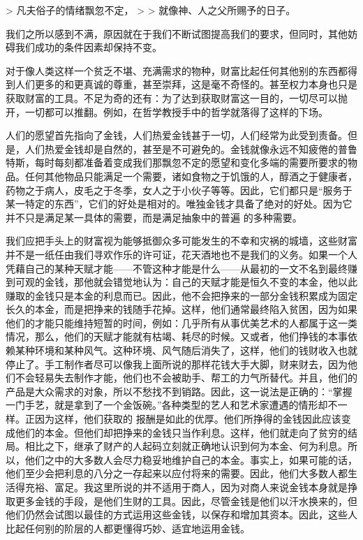 \documentclass[12pt,oneside]{book}
\begin{document}


> 凡夫俗子的情绪飘忽不定，
>
> 就像神、人之父所赐予的日子。 

 

我们之所以感到不满，原因就在于我们不断试图提高我们的要求，但同时，其他妨碍我们成功的条件因素却保持不变。 

对于像人类这样一个贫乏不堪、充满需求的物种，财富比起任何其他别的东西都得到人们更多的和更真诚的尊重，甚至崇拜，这是毫不奇怪的。甚至权力本身也只是获取财富的工具。不足为奇的还有：为了达到获取财富这一目的，一切尽可以抛开，一切都可以推翻。例如，在哲学教授手中的哲学就落得了这样的下场。 

人们的愿望首先指向了金钱，人们热爱金钱甚于一切，人们经常为此受到责备。但是，人们热爱金钱却是自然的，甚至是不可避免的。金钱就像永远不知疲倦的普鲁特斯，每时每刻都准备着变成我们那飘忽不定的愿望和变化多端的需要所要求的物品。任何其他物品只能满足一个需要，诸如食物之于饥饿的人，醇酒之于健康者，药物之于病人，皮毛之于冬季，女人之于小伙子等等。因此，它们都只是“服务于某一特定的东西”，它们的好处是相对的。唯独金钱才具备了绝对的好处。因为它并不只是满足某一具体的需要，而是满足抽象中的普遍
的多种需要。 

我们应把手头上的财富视为能够抵御众多可能发生的不幸和灾祸的城墙，这些财富并不是一纸任由我们寻欢作乐的许可证，花天酒地也不是我们的义务。如果一个人凭藉自己的某种天赋才能——不管这种才能是什么——从最初的一文不名到最终赚到可观的金钱，那他就会错觉地认为：自己的天赋才能是恒久不变的本金，他以此赚取的金钱只是本金的利息而已。因此，他不会把挣来的一部分金钱积累成为固定长久的本金，而是把挣来的钱随手花掉。这样，他们通常最终陷入贫困，因为如果他们的才能只能维持短暂的时间，例如：几乎所有从事优美艺术的人都属于这一类情况，那么，他们的天赋才能就有枯竭、耗尽的时候。又或者，他们挣钱的本事依赖某种环境和某种风气。这种环境、风气随后消失了，这样，他们的钱财收入也就停止了。手工制作者尽可以像我上面所说的那样花钱大手大脚，财来财去，因为他们不会轻易失去制作才能，他们也不会被助手、帮工的力气所替代。并且，他们的产品是大众需求的对象，所以不愁找不到销路。因此，这一说法是正确的：“掌握一门手艺，就是拿到了一个金饭碗。”各种类型的艺人和艺术家遭遇的情形却不一样。正因为这样，他们获取的
报酬是如此的优厚。他们所挣得的金钱因此应该变成他们的本金。但他们却把挣来的金钱只当作利息。这样，他们就走向了贫穷的结局。相比之下，继承了财产的人起码立刻就正确地认识到何为本金、何为利息。所以，他们之中的大多数人会尽力稳妥地维护自己的本金。事实上，如果可能的话，他们至少会把利息的八分之一存起来以应付将来的需要。因此，他们大多数人都生活得充裕、富足。我这里所说的并不适用于商人，因为对商人来说金钱本身就是挣取更多金钱的手段，是他们生财的工具。因此，尽管金钱是他们以汗水换来的，但他们仍然会试图以最佳的方式运用这些金钱，以保存和增加其资本。因此，这些人比起任何别的阶层的人都更懂得巧妙、适宜地运用金钱。 
\end{document}
